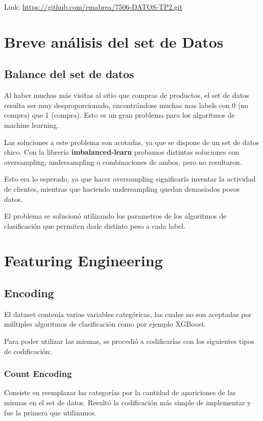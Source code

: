 \documentclass[a4paper ,12pt]{article}
\begin{document}
Link: \url{https://github.com/emabrea/7506-DATOS-TP2.git}

\newpage
\section{Breve análisis del set de Datos}
\subsection{Balance del set de datos}
Al haber muchas más visitas al sitio que compras de productos, el set de datos resulta ser muy desproporcionado, encontrándose muchas mas labels con 0 (no compra) que 1 (compra). Esto es un gran problema para los algoritmos de machine learning.

Las soluciones a este problema son acotadas, ya que se dispone de un set de datos chico. Con la librería \textbf{imbalanced-learn} probamos distintas soluciones con oversampling, undersampling o combinaciones de ambos, pero no resultaron.

Esto era lo esperado, ya que hacer oversampling significaría inventar la actividad de clientes, mientras que haciendo undersampling quedan demasiados pocos datos.

El problema se solucionó utilizando los parametros de los algoritmos de clasificación que permiten darle distinto peso a cada label.



\newpage
\section{Featuring Engineering}

\subsection{Encoding}

El dataset contenía varias variables categóricas, las cuales no son aceptadas por
múltiples algoritmos de clasificación como por ejemplo XGBoost.

Para poder utilizar las mismas, se procedió a codificarlas con los siguientes tipos de
codificación:

\subsubsection{Count Encoding}
Consiste en reemplazar las categorías por la cantidad de
apariciones de las mismas en el set de datos. Resultó la codificación más simple de
implementar y fue la primera que utilizamos.
\end{document}
